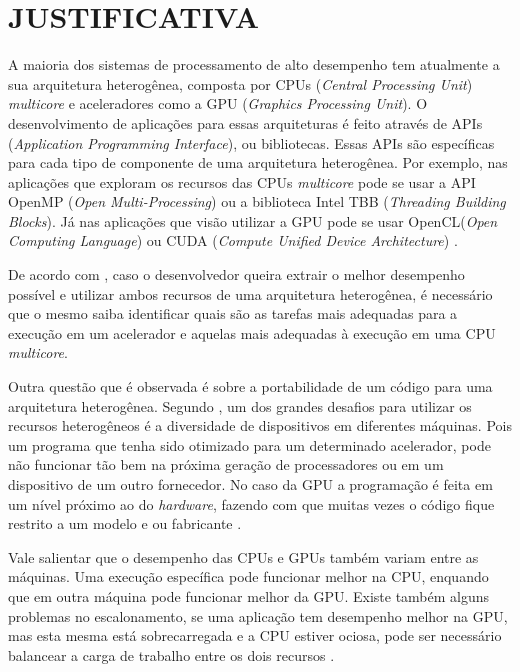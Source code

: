 
\chapter{JUSTIFICATIVA}
\label{chap:justificativa}

A maioria dos sistemas de processamento de alto desempenho tem atualmente a sua arquitetura heterogênea,
composta por CPUs (\textit{Central Processing Unit}) \textit{multicore} e aceleradores como a GPU (\textit{Graphics Processing Unit}).
O desenvolvimento de aplicações para essas arquiteturas é feito através de APIs (\textit{Application Programming Interface}), ou bibliotecas.
Essas APIs são específicas para cada tipo de componente de uma arquitetura heterogênea. Por exemplo, nas aplicações que exploram os recursos
das CPUs \textit{multicore} pode se usar a API OpenMP (\textit{Open Multi-Processing}) \cite{openmp:2018} ou a biblioteca
Intel TBB \cite{inteltbb:2018} (\textit{Threading Building Blocks}).
Já nas aplicações que visão utilizar a GPU pode se usar OpenCL(\textit{Open Computing Language}) \cite{opencl:2018} ou CUDA (\textit{Compute Unified Device Architecture}) \cite{cuda:2018}.

De acordo com \cite{intrArqHete:2012}, caso o desenvolvedor queira extrair o melhor desempenho possível e utilizar ambos recursos de uma
arquitetura heterogênea, é necessário que o mesmo saiba identificar quais são as tarefas mais adequadas para a execução em um acelerador
e aquelas mais adequadas à execução em uma CPU \textit{multicore}.

Outra questão que é observada é sobre a portabilidade de um código para uma arquitetura heterogênea.
Segundo \cite{problemsArqHete:2013}, um dos grandes desafios para utilizar os recursos heterogêneos é a diversidade de dispositivos em diferentes máquinas.
Pois um programa que tenha sido otimizado para um determinado acelerador, pode não funcionar tão bem na próxima geração de processadores ou em um dispositivo de um outro fornecedor.
No caso da GPU a programação é feita em um nível próximo ao do \textit{hardware}, fazendo com que muitas vezes o código fique restrito a um modelo e ou fabricante \cite{pinto2011ambientes}.

Vale salientar que o desempenho das CPUs e GPUs também variam entre as máquinas.
Uma execução específica pode funcionar melhor na CPU, enquando que em outra máquina pode funcionar melhor da GPU.
Existe também alguns problemas no escalonamento, se uma aplicação tem desempenho melhor na GPU, mas esta mesma está sobrecarregada e a CPU estiver ociosa, pode ser necessário balancear
a carga de trabalho entre os dois recursos \cite{problemsArqHete:2013}.

